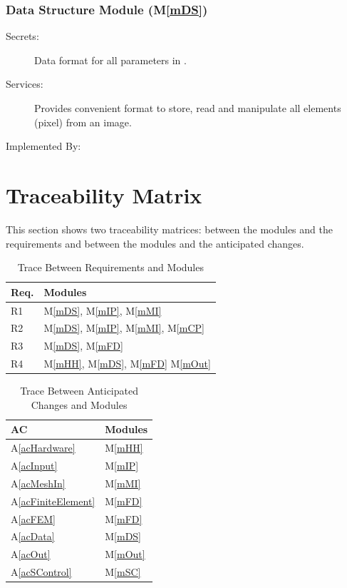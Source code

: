 \documentclass[12pt, titlepage]{article}
\newcommand{\mref}[1]{M\ref{#1}}
\begin{document}
	
	
	\subsubsection{Data Structure Module (\mref{mDS})}
	
	\begin{description} \item[Secrets:]Data format for all parameters in
		\progname{}. \item[Services:]Provides convenient format to store, read and
		manipulate all elements (pixel) from an image. \item[Implemented By:]
		\progname{} \end{description}
	
	
	
	
	
	
	\section{Traceability Matrix} \label{SecTM}
	
	This section shows two traceability matrices: between the modules and the
	requirements and between the modules and the anticipated changes.
	
	\begin{table}[H] \centering \begin{tabular}{p{} p{}}
			\toprule \textbf{Req.} & \textbf{Modules}\\ \midrule R1 & M\ref{mDS},
			M\ref{mIP}, M\ref{mMI}\\ R2 & M\ref{mDS}, M\ref{mIP}, M\ref{mMI}, M\ref{mCP}\\
			R3 & M\ref{mDS}, M\ref{mFD}\\ R4 & M\ref{mHH}, M\ref{mDS}, M\ref{mFD}
			M\ref{mOut}\\ \bottomrule \end{tabular} \caption{Trace Between Requirements and
			Modules} \label{TblRT} \end{table}
	
	\begin{table}[H] \centering \begin{tabular}{p{} p{}}
			\toprule \textbf{AC} & \textbf{Modules}\\ \midrule A\ref{acHardware} &
			M\ref{mHH}\\ A\ref{acInput} & M\ref{mIP}\\ A\ref{acMeshIn} & M\ref{mMI}\\
			A\ref{acFiniteElement} & M\ref{mFD}\\ A\ref{acFEM} & M\ref{mFD}\\ A\ref{acData}
			& M\ref{mDS}\\ A\ref{acOut} & M\ref{mOut}\\ A\ref{acSControl} & M\ref{mSC}\\
			\bottomrule \end{tabular} \caption{Trace Between Anticipated Changes and
			Modules} \label{TblACT} \end{table}
	
\end{document}
